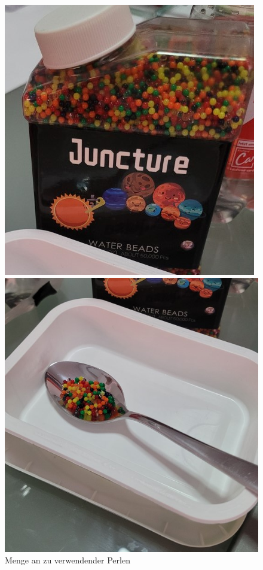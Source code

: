 \begin{figure}[H]
  \begin{minipage}{.5\textwidth}
    \centering
    \includegraphics[width=.8\linewidth]{resources/Wasserperlen.jpg}
  \end{minipage}%
  \begin{minipage}{.5\textwidth}
    \includegraphics[width=.8\linewidth]{resources/Wasserperlen-abmessen.jpg}
  \end{minipage}
  \caption[Wasserperlen]{Menge an zu verwendender Perlen}
\end{figure}
